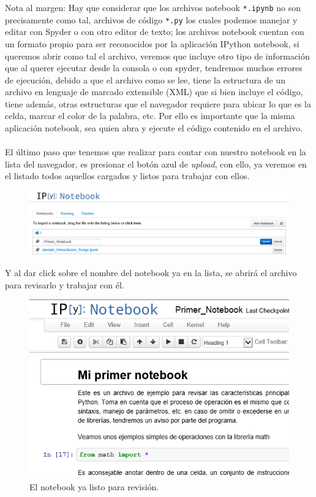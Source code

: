 \documentclass[12pt]{article}
\begin{document}
Nota al margen: Hay que considerar que los archivos notebook \texttt{*.ipynb} no son precisamente como tal, archivos de código \texttt{*.py} los cuales podemos manejar y editar con Spyder o con otro editor de texto; los archivos notebook cuentan con un formato propio para ser reconocidos por la aplicación IPython notebook, si queremos abrir como tal el archivo, veremos que incluye otro tipo de información que al querer ejecutar desde la consola o con spyder, tendremos muchos errores de ejecución, debido a que el archivo como se lee, tiene la estructura de un archivo en lenguaje de marcado extensible (XML) que si bien incluye el código, tiene además, otras estructuras que el navegador requiere para ubicar lo que es la celda, marcar el color de la palabra, etc. Por ello es importante que la misma aplicación notebook, sea quien abra y ejecute el código contenido en el archivo.
\\
\\
El último paso que tenemos que realizar para contar con nuestro notebook en la lista del navegador, es presionar el botón azul de \emph{upload}, con ello, ya veremos en el listado todos aquellos cargados y listos para trabajar con ellos.
\begin{figure}[H]
	\centering
	\includegraphics[scale=0.6]{Imagenes/ipython_notebook_05.png} 
\end{figure}
Y al dar click sobre el nombre del notebook ya en la lista, se abrirá el archivo para revisarlo y trabajar con él.
\begin{figure}[H]
	\centering
	\includegraphics[scale=0.6]{Imagenes/ipython_notebook_07.png}
	\caption{El notebook ya listo para revisión.} 
\end{figure}
\end{document}
